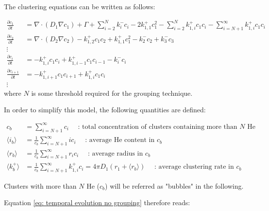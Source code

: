 The clustering equations can be written as follows:

\begin{subequations}
    \begin{align}
        \frac{\partial c_1}{\partial t} &= \nabla \cdot (D_1 \nabla c_1) + \Gamma + \sum\limits_{i=2}^N k_{i}^- c_i - 2k_{1, 1}^+ c_1^2 - \sum\limits_{i=2}^N k_{1,i}^+ c_1 c_i - \sum\limits_{i=N+1}^\infty k_{1,i}^+ c_1 c_i \\
        \frac{\partial c_2}{\partial t} &= \nabla \cdot (D_2 \nabla c_2) - k_{1, 2}^+ c_1 c_2 + k_{1, 1}^+ c_1^2 - k_{2}^- c_2 + k_{3}^- c_3\\
        \vdots \nonumber\\
        \frac{\partial c_i}{\partial t} &= - k_{1, i}^+ c_1 c_i + k_{1, i-1}^+ c_1 c_{i-1} - k_{i}^- c_i\\
        \frac{\partial c_{i+1}}{\partial t} &= - k_{1, i+1}^+ c_1 c_{i+1} + k_{1, i}^+ c_1 c_i\\
        \vdots \nonumber
    \end{align}
    \label{eq: temporal evolution no grouping}
\end{subequations}
where $N$ is some threshold required for the grouping technique.

In order to simplify this model, the following quantities are defined:

\begin{align}
    c_b &= \sum\limits_{i=N+1}^\infty c_i \quad \text{ : total concentration of clusters containing more than $N$ He} \\
    \langle i_b \rangle &= \frac{1}{c_b} \sum\limits_{i=N+1}^\infty i c_i \quad \text{ : average He content in $c_b$} \\
    \langle r_b \rangle &=  \frac{1}{c_b}\sum\limits_{i=N+1}^\infty r_i c_i \quad \text{ : average radius in $c_b$}\\
    \langle k_b^+ \rangle &=  \frac{1}{c_b}\sum\limits_{i=N+1}^\infty k_{1,i}^+ c_i = 4 \pi D_1 (r_1 + \langle r_b \rangle) \quad \text{ : average clustering rate in $c_b$}
\end{align}

Clusters with more than $N$ He ($c_b$) will be referred as "bubbles" in the following.

Equation \ref{eq: temporal evolution no grouping} therefore reads:


